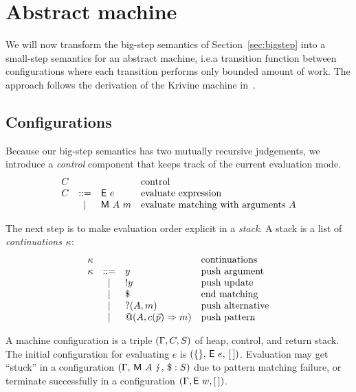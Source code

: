 \section{Abstract machine}\label{sec:smallstep}

We will now transform the big-step semantics of
Section~\ref{sec:bigstep} into a small-step semantics for an abstract
machine, i.e.\@ a transition function between configurations where
each transition performs only bounded amount of work. The approach
follows the derivation of the Krivine machine in~\cite{sestof_1997}.

\subsection{Configurations}
Because our big-step semantics has two mutually recursive judgements,
we introduce a \emph{control} component that keeps
track of the current evaluation mode.
\[ \begin{array}{lcll}
     C & && \text{control} \\
     C &::=& \textsf{E}~e & \text{evaluate expression}\\
     &\mid& \textsf{M}~A~m & \text{evaluate matching with arguments}~A 
\end{array} \]

The next step is to make evaluation order explicit 
in a \emph{stack}.  A stack is a list of \emph{continuations} $\kappa$:
\[ \begin{array}{lcll}
     \kappa &&& \text{continuations} \\
     \kappa &::=& y & \text{push argument} \\
           &\mid& !y & \text{push update} \\
           &\mid& \$ & \text{end matching} \\
           &\mid& ?(A,m) & \text{push alternative} \\
           &\mid& @(A,c(\vec{p}) \Rightarrow m) & \text{push pattern}
   \end{array}
   \]

A machine configuration is a triple
$(\Gamma,C,S)$ of heap, control, 
and return stack.  The initial configuration for evaluating $e$ is
$(\{\},\, \textsf{E}~e,\, [\,])$.  Evaluation may get ``stuck''
in a configuration
$(\Gamma,\, \textsf{M}~A~\lightning,\, \$:S)$
due to pattern matching failure, or
terminate successfully in a
configuration $(\Gamma, \textsf{E}~w, [\,])$.

